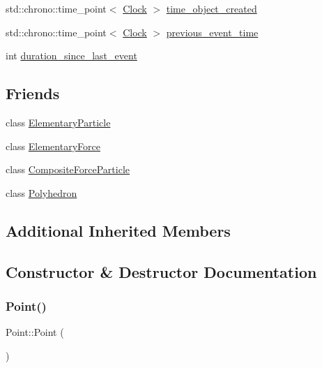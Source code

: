 \begin{DoxyCompactItemize}
std\+::chrono\+::time\+\_\+point$<$ \mbox{\hyperlink{universe_8h_a0ef8d951d1ca5ab3cfaf7ab4c7a6fd80}{Clock}} $>$ \mbox{\hyperlink{classPoint_a7d06d004516b58e6a6d85a35e689b28a}{time\+\_\+object\+\_\+created}}
\item 
std\+::chrono\+::time\+\_\+point$<$ \mbox{\hyperlink{universe_8h_a0ef8d951d1ca5ab3cfaf7ab4c7a6fd80}{Clock}} $>$ \mbox{\hyperlink{classPoint_abdae57027e086386d297d503feba1b41}{previous\+\_\+event\+\_\+time}}
\item 
int \mbox{\hyperlink{classPoint_ab3a9b92a8ae102e1413988be02f72368}{duration\+\_\+since\+\_\+last\+\_\+event}}
\end{DoxyCompactItemize}
\subsection*{Friends}
\begin{DoxyCompactItemize}
\item 
class \mbox{\hyperlink{classPoint_af2ace341c1d7ccd30de3502502773591}{Elementary\+Particle}}
\item 
class \mbox{\hyperlink{classPoint_a6e57500586e9cd366f5cf76ea0299957}{Elementary\+Force}}
\item 
class \mbox{\hyperlink{classPoint_a9bc6eb2a4c20ce83728a7c9a31b91f19}{Composite\+Force\+Particle}}
\item 
class \mbox{\hyperlink{classPoint_a28d1b9582890ca3e2b61dafdc1c3ba84}{Polyhedron}}
\end{DoxyCompactItemize}
\subsection*{Additional Inherited Members}


\subsection{Constructor \& Destructor Documentation}
\mbox{\label{classPoint_ad92f2337b839a94ce97dcdb439b4325a}} 
\subsubsection{\texorpdfstring{Point()}{Point()}\hspace{0.1cm}{\footnotesize\ttfamily [1/4]}}
{\footnotesize\ttfamily Point\+::\+Point (\begin{DoxyParamCaption}{ }\end{DoxyParamCaption})\hspace{0.3cm}{\ttfamily [inline]}}

